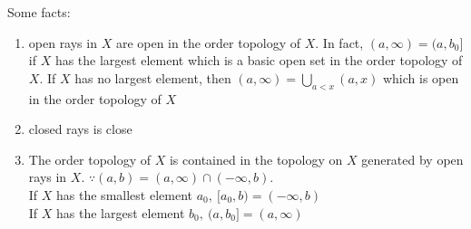 Some facts:

\begin{enumerate}
	\item open rays in $X$ are open in the order topology of $X$. In fact, $(a,\infty) = (a,b_0]$ if $X$ has the largest element which is a basic open set in the order topology of $X$. If $X$ has no largest element, then $(a,\infty) = \bigcup_{a < x}(a,x)$ which is open in the order topology of $X$
	\item closed rays is close
	\item The order topology of $X$ is contained in the topology on $X$ generated by open rays in $X$. $\because (a,b) = (a,\infty) \cap (-\infty,b)$. \\
	If $X$ has the smallest element $a_0,~ [a_0,b) = (-\infty,b)$\\
	If $X$ has the largest element $b_0,~(a,b_0] = (a,\infty)$
\end{enumerate}







